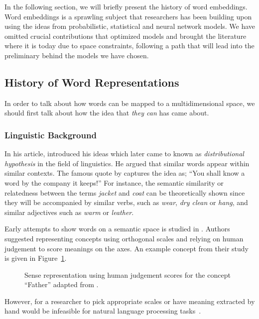 In the following section, we will briefly present the history of word embeddings.
Word embeddings is a sprawling subject that researchers has been building upon using the ideas from probabilistic, statistical and neural network models.
We have omitted crucial contributions that optimized models and brought the literature where it is today due to space constraints, following a path that will lead into the preliminary behind the models we have chosen.

\subsection{History of Word Representations}%
\label{sub:history_of_word_representations}

In order to talk about how words can be mapped to a multidimensional space, we should first talk about how the idea that \emph{they can} has came about.

\subsubsection{Linguistic Background}%
\label{ssub:linguistic_background}

In his \citeyear{harris_distributional_1954} article, \textcite{harris_distributional_1954} introduced his ideas which later came to known as \emph{distributional hypothesis} in the field of linguistics.
He argued that similar words appear within similar contexts.
The famous quote by \textcite{firth_synopsis_1957} captures the idea as;
\enquote{You shall know a word by the company it keeps!}
For instance, the semantic similarity or relatedness between the terms \emph{jacket} and \emph{coat} can be theoretically shown since they will be accompanied by similar verbs, such as \emph{wear}, \emph{dry clean} or \emph{hang}, and similar adjectives such as \emph{warm} or \emph{leather}.

Early attempts to show words on a semantic space is studied in \textcite{osgood_measurement_1957}.
Authors suggested representing concepts using orthogonal scales and relying on human judgement to score meanings on the axes.
An example concept from their study is given in Figure~\ref{fig:early_vectors}.
\begin{figure}[htbp]
    \centering
    \caption{Sense representation using human judgement scores for the concept \enquote{Father} adapted from \textcite{osgood_measurement_1957}.}%
    \label{fig:early_vectors}
\end{figure}
However, for a researcher to pick appropriate scales or have meaning extracted by hand would be infeasible for natural language processing tasks~\cite{lund_producing_1996}.

